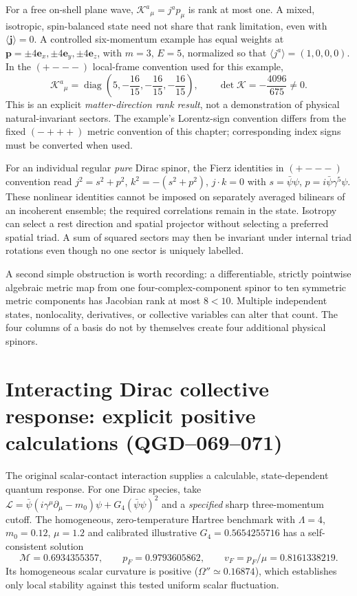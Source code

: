 \documentclass[11pt,a4paper]{article}
\begin{document}
For a free on-shell plane wave, $\mathcal K^a{}_{\mu}=j^a p_\mu$ is
rank at most one. A mixed, isotropic, spin-balanced state need not share
that rank limitation, even with $\langle\bm j\rangle=0$. A controlled
six-momentum example has equal weights at
$\bm p=\pm4\bm e_x,\pm4\bm e_y,\pm4\bm e_z$, with $m=3$, $E=5$,
normalized so that $\langle j^a\rangle=(1,0,0,0)$.  In the
$(+---)$ local-frame convention used for this example,
\begin{equation}\label{eq:qgd075-six-modes}
 \boxed{\mathcal K^a{}_{\mu}=\operatorname{diag}
 \left(5,-\frac{16}{15},-\frac{16}{15},-\frac{16}{15}\right),\qquad
 \det\mathcal K=-\frac{4096}{675}\ne0.}
\end{equation}
This is an explicit \emph{matter-direction rank result}, not a
demonstration of physical natural-invariant sectors. The example's
Lorentz-sign convention differs from the fixed $(-+++)$ metric convention
of this chapter; corresponding index signs must be converted when used.

For an individual regular \emph{pure} Dirac spinor, the Fierz identities
in $(+---)$ convention read
$j^2=s^2+p^2$, $k^2=-(s^2+p^2)$, $j\cdot k=0$
with $s=\bar\psi\psi$, $p=i\bar\psi\gamma^5\psi$.
These nonlinear identities cannot be imposed on separately averaged
bilinears of an incoherent ensemble; the required correlations remain
in the state. Isotropy can select a rest direction and spatial projector
without selecting a preferred spatial triad. A sum of squared sectors
may then be invariant under internal triad rotations even though no
one sector is uniquely labelled.

A second simple obstruction is worth recording: a differentiable,
strictly pointwise algebraic metric map from one four-complex-component
spinor to ten symmetric metric components has Jacobian rank at most
$8<10$.  Multiple independent states, nonlocality, derivatives, or
collective variables can alter that count.  The four columns of a basis
do not by themselves create four additional physical spinors.

\section{Interacting Dirac collective response: explicit positive calculations (QGD--069--071)}\label{sec:qgd075-micro-response}
The original scalar-contact interaction supplies a calculable,
state-dependent quantum response. For one Dirac species, take
$\mathcal L=\bar\psi(i\gamma^\mu\partial_\mu-m_0)\psi
+G_4(\bar\psi\psi)^2$ and a \emph{specified} sharp three-momentum cutoff.
The homogeneous, zero-temperature Hartree benchmark with
$\Lambda=4$, $m_0=0.12$, $\mu=1.2$ and calibrated illustrative
$G_4=0.5654255716$ has a self-consistent solution
\begin{equation}\label{eq:qgd075-medium}
 \boxed{\mathcal M=0.6934355357,\qquad
 p_F=0.9793605862,\qquad v_F=p_F/\mu=0.8161338219.}
\end{equation}
Its homogeneous scalar curvature is positive ($\Omega''\simeq0.16874$),
which establishes only local stability against this tested uniform
scalar fluctuation.
\end{document}
